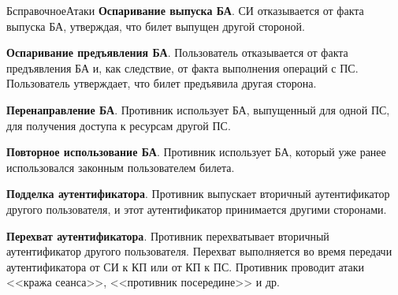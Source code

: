 \begin{appendix}{Б}{справочное}{Атаки}
{\bf Оспаривание выпуска БА}.
СИ отказывается от факта выпуска БА,
утверждая, что билет выпущен другой стороной.


{\bf Оспаривание предъявления БА}.
Пользователь отказывается от факта предъявления БА
и, как следствие, от факта выполнения операций с ПС.
Пользователь утверждает, что билет предъявила другая сторона.


{\bf Перенаправление БА}.
Противник использует БА, выпущенный для одной ПС,
для получения доступа к ресурсам другой ПС. 


{\bf Повторное использование БА}.
Противник использует БА, который уже ранее 
использовался законным пользователем билета.


{\bf Подделка аутентификатора}.
Противник выпускает вторичный аутентификатор другого 
пользователя, и этот аутентификатор принимается другими сторонами. 


{\bf Перехват аутентификатора}.
Противник перехватывает вторичный аутентификатор другого пользователя.
Перехват выполняется во время передачи аутентификатора от СИ к КП или 
от КП к ПС. Противник проводит атаки <<кража сеанса>>, <<противник посередине>>
и др. 



\end{appendix}
